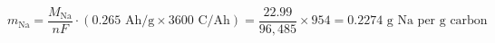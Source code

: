 \documentclass[preview]{standalone}
\begin{document}
\[m_\text{Na} = \frac{M_\text{Na}}{nF} \cdot (0.265 \text{ Ah/g} \times 3600 \text{ C/Ah}) = \frac{22.99}{96{,}485} \times 954 = 0.2274 \text{ g Na per g carbon}\]
\end{document}
